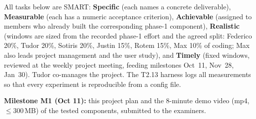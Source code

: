 \documentclass[11pt,a4paper]{article}
\begin{document}
All tasks below are SMART: \textbf{Specific} (each names a concrete
deliverable), \textbf{Measurable} (each has a numeric acceptance criterion),
\textbf{Achievable} (assigned to members who already built the corresponding
phase-1 component), \textbf{Realistic} (windows are sized from the recorded
phase-1 effort and the agreed split: Federico 20\%, Tudor 20\%, Sotiris 20\%,
Justin 15\%, Rotem 15\%, Max 10\% of coding; Max also leads project
management and the user study), and \textbf{Timely} (fixed windows, reviewed
at the weekly project meeting, feeding milestones Oct~11, Nov~28, Jan~30).
Tudor co-manages the project. The T2.13 harness logs all measurements so that
every experiment is reproducible from a config file.

\noindent\textbf{Milestone M1 (Oct 11):} this project plan and the
8-minute demo video (mp4, $\leq$300\,MB) of the tested components,
submitted to the examiners.
\end{document}
